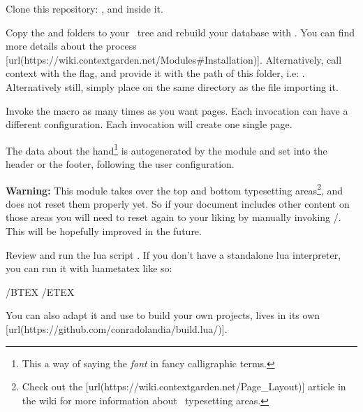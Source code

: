 \startenumerate[n,packed][stopper=.]
\item
  Clone this repository: , and  inside it.
\item
  Copy the  and  folders to your \ConTeXt~tree and rebuild your database with . You can find more details about the process [url(https://wiki.contextgarden.net/Modules\#Installation)]. Alternatively, call context with the  flag, and provide it with the path of this folder, i.e: . Alternatively still, simply place  on the same directory as the file importing it.
\item
  Invoke the \type{\Pauta} macro as many times as you want pages. Each invocation can have a different configuration. Each invocation will create one single page.
\item
  The data about the hand\footnote{This a way of saying the {\em font} in fancy calligraphic terms.} is autogenerated by the module and set into the header or the footer, following the user configuration.
\item
  {\bf Warning:} This module takes over the top and bottom typesetting areas\footnote{Check out the [url(https://wiki.contextgarden.net/Page_Layout)] article in the wiki for more information about \ConTeXt~typesetting areas.}, and does not reset them properly yet. So if your document includes other content on those areas you will need to reset again to your liking by manually invoking \type{\setuptoptexts}/\type{\setupbottomtexts}. This will be hopefully improved in the future.
\stopenumerate

\stopsection

\startsection[title={Generating the example file},reference={generating-the-example-file}]

Review and run the lua script . If you don't have a standalone lua interpreter, you can run it with luametatex like so:

\starthighlighting
/BTEX /ETEX
\stophighlighting

You can also adapt it and use to build your own projects,  lives in its own [url(https://github.com/conradolandia/build.lua/)].

\stopsection

\startsection[title={Configuration Parameters},reference={configuration-parameters}]

